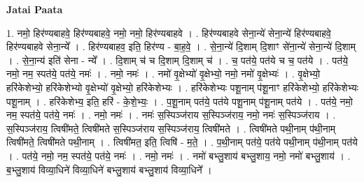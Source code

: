 \documentclass[17pt]{extarticle}
\begin{document}
\textbf{Jatai Paata} \newline

1. नमो॒ हिर॑ण्यबाहवे॒ हिर॑ण्यबाहवे॒ नमो॒ नमो॒ हिर॑ण्यबाहवे । . हिर॑ण्यबाहवे सेना॒न्ये॑ सेना॒न्ये॑ हिर॑ण्यबाहवे॒ हिर॑ण्यबाहवे सेना॒न्ये᳚ । . हिर॑ण्यबाहव॒ इति॒ हिर॑ण्य - बा॒ह॒वे॒ । . से॒ना॒न्ये॑ दि॒शाम् दि॒शाꣳ से॑ना॒न्ये॑ सेना॒न्ये॑ दि॒शाम् । . से॒ना॒न्य॑ इति॑ सेना - न्ये᳚ । . दि॒शाम् च॑ च दि॒शाम् दि॒शाम् च॑ । . च॒ पत॑ये॒ पत॑ये च च॒ पत॑ये । . पत॑ये॒ नमो॒ नम॒ स्पत॑ये॒ पत॑ये॒ नमः॑ । . नमो॒ नमः॑ । . नमो॑ वृ॒क्षेभ्यो॑ वृ॒क्षेभ्यो॒ नमो॒ नमो॑ वृ॒क्षेभ्यः॑ । . वृ॒क्षेभ्यो॒ हरि॑केशेभ्यो॒ हरि॑केशेभ्यो वृ॒क्षेभ्यो॑ वृ॒क्षेभ्यो॒ हरि॑केशेभ्यः । . हरि॑केशेभ्यः पशू॒नाम् प॑शू॒नाꣳ हरि॑केशेभ्यो॒ हरि॑केशेभ्यः पशू॒नाम् । . हरि॑केशेभ्य॒ इति॒ हरि॑ - के॒शे॒भ्यः॒ । . प॒शू॒नाम् पत॑ये॒ पत॑ये पशू॒नाम् प॑शू॒नाम् पत॑ये । . पत॑ये॒ नमो॒ नम॒ स्पत॑ये॒ पत॑ये॒ नमः॑ । . नमो॒ नमः॑ । . नमः॑ स॒स्पिञ्ज॑राय स॒स्पिञ्ज॑राय॒ नमो॒ नमः॑ स॒स्पिञ्ज॑राय । . स॒स्पिञ्ज॑राय॒ त्विषी॑मते॒ त्विषी॑मते स॒स्पिञ्ज॑राय स॒स्पिञ्ज॑राय॒ त्विषी॑मते । . त्विषी॑मते पथी॒नाम् प॑थी॒नाम् त्विषी॑मते॒ त्विषी॑मते पथी॒नाम् । . त्विषी॑मत॒ इति॒ त्विषि॑ - म॒ते॒ । . प॒थी॒नाम् पत॑ये॒ पत॑ये पथी॒नाम् प॑थी॒नाम् पत॑ये । . पत॑ये॒ नमो॒ नम॒ स्पत॑ये॒ पत॑ये॒ नमः॑ । . नमो॒ नमः॑ । . नमो॑ बभ्लु॒शाय॑ बभ्लु॒शाय॒ नमो॒ नमो॑ बभ्लु॒शाय॑ । . ब॒भ्लु॒शाय॑ विव्या॒धिने॑ विव्या॒धिने॑ बभ्लु॒शाय॑ बभ्लु॒शाय॑ विव्या॒धिने᳚ । \newline
\end{document}
